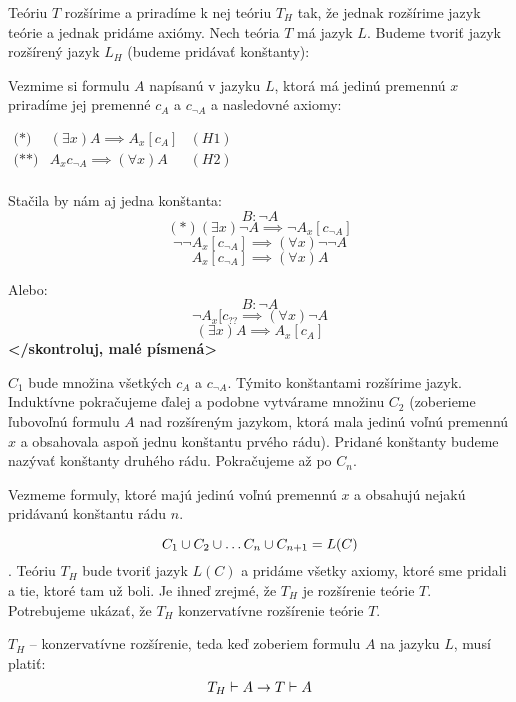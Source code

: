 \begin{dokaz}
    Teóriu $T$ rozšírime a priradíme k nej teóriu $T_H$ tak, že
    jednak rozšírime jazyk teórie a jednak pridáme axiómy.
    Nech teória $T$ má jazyk $L$.
    Budeme tvoriť jazyk rozšírený jazyk $L_H$ (budeme pridávať konštanty):


\par Vezmime si formulu $A$ napísanú v jazyku $L$, ktorá má jedinú premennú $x$
priradíme jej premenné $c_A$ a $c_{\neg A}$ a nasledovné axiomy: 

$
\begin{array}{lll}
\mbox{(*)} & (\exists x) A \implies A_x[c_A] & (H1) \\
\mbox{(**)} & A_x{c_{\neg A}} \implies (\forall x) A & (H2) \\
\end{array}
$

Stačila by nám aj jedna konštanta:
$$B: \neg A$$
$$ (*) (\exists x) \neg A \implies \neg A_x[c_{\neg A}]$$
$$\neg \neg A_x[c_{\neg A}] \implies (\forall x) \neg \neg A$$
$$A_x[c_{\neg A}] \implies (\forall x) A$$

Alebo:
$$B: \neg A$$
$$\neg A_x[c_{??} \implies (\forall x) \neg A$$
$$(\exists x) A \implies A_x[c_A]$$
\textbf{</skontroluj, malé písmená>}

\par $C_1$ bude množina všetkých $c_A$ a $c_{\neg A}$. Týmito konštantami
rozšírime jazyk. Induktívne pokračujeme ďalej a podobne vytvárame množinu $C_2$
(zoberieme ľubovoľnú formulu $A$ nad rozšíreným jazykom, ktorá mala jedinú voľnú
premennú $x$ a obsahovala aspoň jednu konštantu prvého rádu).
Pridané konštanty budeme nazývať konštanty druhého rádu. Pokračujeme až po
$C_n$.

\par Vezmeme formuly, ktoré majú jedinú voľnú premennú $x$ a obsahujú nejakú
pridávanú konštantu rádu $n$.

\par
$$C_1 \cup C_2 \cup \ldots C_n \cup C_{n+1} = L(C)$$. 
Teóriu $T_H$ bude tvoriť jazyk $L(C)$ a pridáme všetky axiomy, ktoré sme pridali
a tie, ktoré tam už boli. Je ihneď zrejmé, že $T_H$ je rozšírenie teórie $T$.
Potrebujeme ukázať, že $T_H$ konzervatívne rozšírenie teórie $T$.

$T_H$ -- konzervatívne rozšírenie, teda keď zoberiem formulu $A$ na jazyku $L$,
musí platiť:
$$ T_H \vdash A \rightarrow T \vdash A$$


\end{dokaz}
